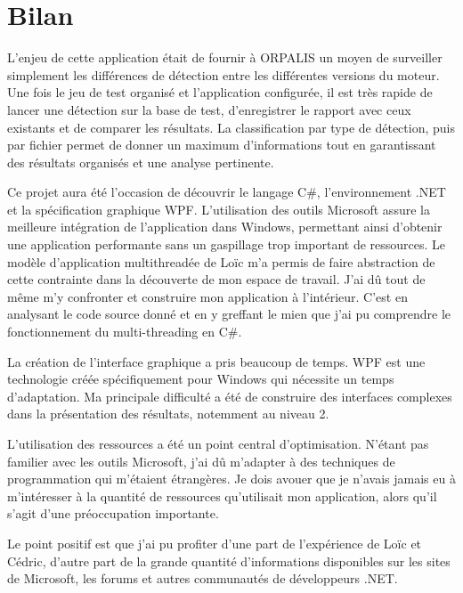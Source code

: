 \clearpage
\section{Bilan}

L'enjeu de cette application était de fournir à ORPALIS un moyen de surveiller simplement les différences de détection entre les différentes versions du moteur. Une fois le jeu de test organisé et l'application configurée, il est très rapide de lancer une détection sur la base de test, d'enregistrer le rapport avec ceux existants et de comparer les résultats. La classification par type de détection, puis par fichier permet de donner un maximum d'informations tout en garantissant des résultats organisés et une analyse pertinente.

Ce projet aura été l'occasion de découvrir le langage C\#, l'environnement .NET et la spécification graphique WPF. L'utilisation des outils Microsoft assure la meilleure intégration de l'application dans Windows, permettant ainsi d'obtenir une application performante sans un gaspillage trop important de ressources. Le modèle d'application multithreadée de Loïc m'a permis de faire abstraction de cette contrainte dans la découverte de mon espace de travail. J'ai dû tout de même m'y confronter et construire mon application à l'intérieur. C'est en analysant le code source donné et en y greffant le mien que j'ai pu comprendre le fonctionnement du multi-threading en C\#.

La création de l'interface graphique a pris beaucoup de temps. WPF est une technologie créée spécifiquement pour Windows qui nécessite un temps d'adaptation. Ma principale difficulté a été de construire des interfaces complexes dans la présentation des résultats, notemment au niveau 2.

L'utilisation des ressources a été un point central d'optimisation. N'étant pas familier avec les outils Microsoft, j'ai dû m'adapter à des techniques de programmation qui m'étaient étrangères. Je dois avouer que je n'avais jamais eu à m'intéresser à la quantité de ressources qu'utilisait mon application, alors qu'il s'agit d'une préoccupation importante.

Le point positif est que j'ai pu profiter d'une part de l'expérience de Loïc et Cédric, d'autre part de la grande quantité d'informations disponibles sur les sites de Microsoft, les forums et autres communautés de développeurs .NET.
